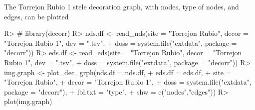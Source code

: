 \documentclass[article]{jss}
\begin{document}
The Torrejon Rubio 1 stele decoration graph, with nodes, type of nodes, and edges, can be plotted

\begin{Schunk}
\begin{Sinput}
R> # library(decorr)
R> nds.df <- read_nds(site = "Torrejon Rubio", decor = "Torrejon Rubio 1", dev = ".tsv",
+                     doss = system.file("extdata", package = "decorr"))
R> eds.df <- read_eds(site = "Torrejon Rubio", decor = "Torrejon Rubio 1", dev = ".tsv",
+                     doss = system.file("extdata", package = "decorr"))
R> img.graph <- plot_dec_grph(nds.df = nds.df,
+                             eds.df = eds.df,
+                             site = "Torrejon Rubio",
+                             decor = "Torrejon Rubio 1",
+                             doss = system.file("extdata", package = "decorr"),
+                             lbl.txt = "type",
+                             shw = c("nodes","edges"))
R> plot(img.graph)
\end{Sinput}
\end{Schunk}
\end{document}
